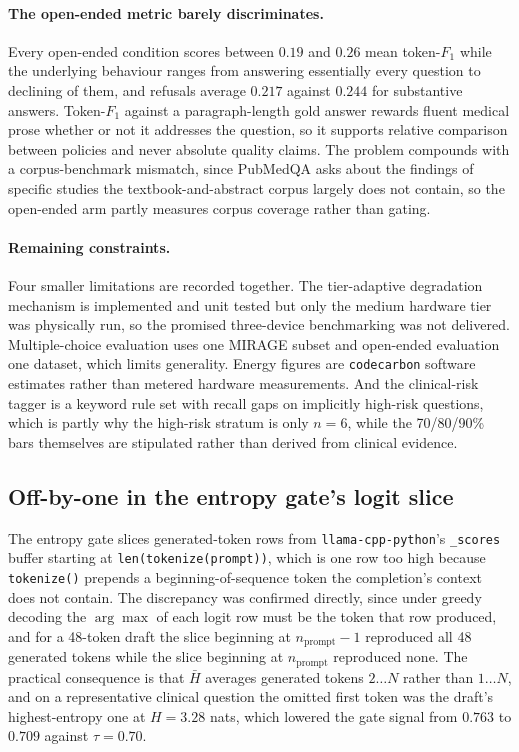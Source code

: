 \paragraph{The open-ended metric barely discriminates.} Every open-ended
condition scores between $0.19$ and $0.26$ mean token-$F_1$ while the
underlying behaviour ranges from answering essentially every question to
declining \retPoneOpen{} of them, and refusals average $0.217$ against
$0.244$ for substantive answers. Token-$F_1$ against a paragraph-length gold
answer rewards fluent medical prose whether or not it addresses the question,
so it supports relative comparison between policies and never absolute quality
claims. The problem compounds with a corpus-benchmark mismatch, since PubMedQA
asks about the findings of specific studies the textbook-and-abstract corpus
largely does not contain, so the open-ended arm partly measures corpus
coverage rather than gating.

\paragraph{Remaining constraints.} Four smaller limitations are recorded
together. The tier-adaptive degradation mechanism is implemented and unit
tested but only the medium hardware tier was physically run, so the promised
three-device benchmarking was not delivered. Multiple-choice evaluation uses
one MIRAGE subset and open-ended evaluation one dataset, which limits
generality. Energy figures are \texttt{codecarbon} software estimates rather
than metered hardware measurements. And the clinical-risk tagger is a keyword
rule set with recall gaps on implicitly high-risk questions, which is partly
why the high-risk stratum is only $n=6$, while the 70/80/90\% bars themselves
are stipulated rather than derived from clinical evidence.

\subsection{Off-by-one in the entropy gate's logit slice}
\label{sec:limitation-entropy-offset}

The entropy gate slices generated-token rows from
\texttt{llama-cpp-python}'s \texttt{\_scores} buffer starting at
\texttt{len(tokenize(prompt))}, which is one row too high because
\texttt{tokenize()} prepends a beginning-of-sequence token the completion's
context does not contain. The discrepancy was confirmed directly, since under
greedy decoding the $\arg\max$ of each logit row must be the token that row
produced, and for a 48-token draft the slice beginning at
$n_{\text{prompt}} - 1$ reproduced all 48 generated tokens while the slice
beginning at $n_{\text{prompt}}$ reproduced none. The practical consequence is
that $\bar{H}$ averages generated tokens $2 \ldots N$ rather than
$1 \ldots N$, and on a representative clinical question the omitted first
token was the draft's highest-entropy one at $H = 3.28$ nats, which lowered
the gate signal from $0.763$ to $0.709$ against $\tau = 0.70$.

